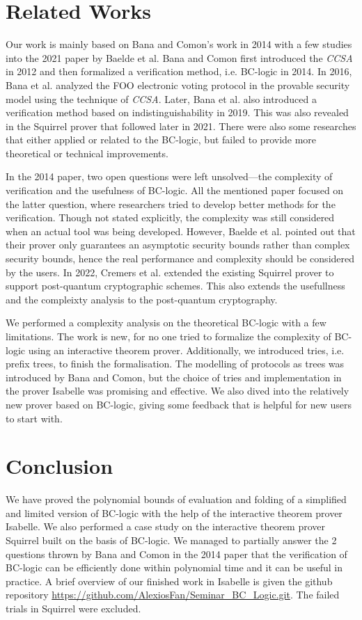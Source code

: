\documentclass[conference]{IEEEtran}
\begin{document}
\section{Related Works}
Our work is mainly based on Bana and Comon's work\cite{BC-logic} in 2014 with a few studies into the 2021 paper by Baelde et al.\cite{Squirrel} Bana and Comon first introduced the \textit{CCSA} in 2012 \cite{CCSA} and then formalized a verification method, i.e. BC-logic in 2014. In 2016, Bana et al. analyzed the FOO electronic voting protocol in the provable security model using the technique of \textit{CCSA}.\cite{BanaVoting} Later, Bana et al. also introduced a verification method based on indistinguishability in 2019.\cite{CCSAVerif} This was also revealed in the Squirrel prover that followed later in 2021. There were also some researches that either applied or related to the BC-logic, but failed to provide more theoretical or technical improvements.

In the 2014 paper, two open questions were left unsolved---the complexity of verification and the usefulness of BC-logic. All the mentioned paper focused on the latter question, where researchers tried to develop better methods for the verification. Though not stated explicitly, the complexity was still considered when an actual tool was being developed. However, Baelde et al. pointed out that their prover only guarantees an asymptotic security bounds rather than complex security bounds, hence the real performance and complexity should be considered by the users. In 2022, Cremers et al. extended the existing Squirrel prover to support post-quantum cryptographic schemes. This also extends the usefullness and the compleixty analysis to the post-quantum cryptography.\cite{PostQuantum}

We performed a complexity analysis on the theoretical BC-logic with a few limitations. The work is new, for no one tried to formalize the complexity of BC-logic using an interactive theorem prover. Additionally, we introduced tries, i.e. prefix trees, to finish the formalisation. The modelling of protocols as trees was introduced by Bana and Comon, but the choice of tries and implementation in the prover Isabelle was promising and effective. We also dived into the relatively new prover based on BC-logic, giving some feedback that is helpful for new users to start with.

\section{Conclusion}
We have proved the polynomial bounds of evaluation and folding of a simplified and limited version of BC-logic with the help of the interactive theorem prover Isabelle. We also performed a case study on the interactive theorem prover Squirrel built on the basis of BC-logic. We managed to partially answer the 2 questions thrown by Bana and Comon in the 2014 paper\cite{BC-logic} that the verification of BC-logic can be efficiently done within polynomial time and it can be useful in practice. A brief overview of our finished work in Isabelle is given the github repository \url{https://github.com/AlexiosFan/Seminar_BC_Logic.git}. The failed trials in Squirrel were excluded.
\end{document}
